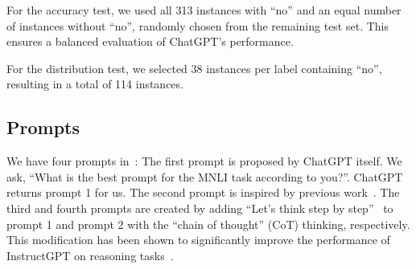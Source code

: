 For the accuracy test, we used all 313 instances 
with ``no'' and an equal number of instances without 
``no'', randomly chosen from the remaining test set. 
This ensures a balanced evaluation of ChatGPT's performance.

For the distribution test, we selected 38 
instances per label containing ``no'', 
resulting in a total of 114 instances. 

\subsection{Prompts}
We have four prompts in~:
The first prompt is proposed by ChatGPT itself. 
We ask, ``What is the best prompt for the MNLI task according to you?''. 
ChatGPT returns prompt 1 for us. 
The second prompt is inspired by previous work~\cite{qin2023chatgpt}.
The third and fourth prompts are created by adding ``Let's think step by step''~\cite{kojima2022large}
to prompt 1 and prompt 2 with the ``chain of thought'' (CoT) thinking, respectively. 
This modification has been shown to significantly improve 
the performance of InstructGPT on reasoning tasks~\cite{ouyang2022training}.

